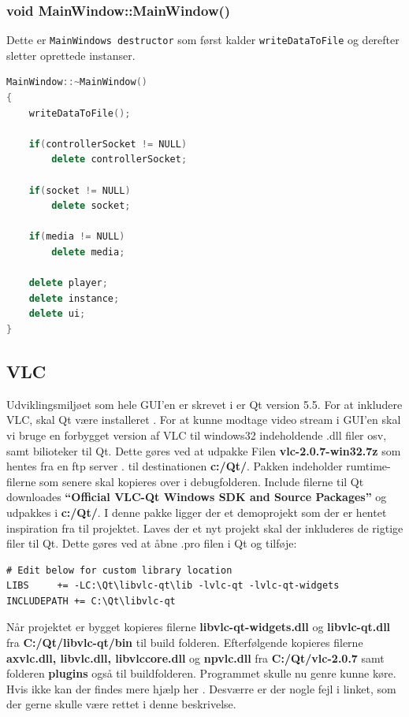 \subsubsection{void MainWindow::MainWindow()}
Dette er \texttt{MainWindows destructor} som først kalder \texttt{writeDataToFile} og derefter sletter oprettede instanser.
\begin{lstlisting}[caption={MainWindow},label=lst:MainWindow, language=c++]
MainWindow::~MainWindow()
{
    writeDataToFile();

    if(controllerSocket != NULL)
        delete controllerSocket;

    if(socket != NULL)
        delete socket;

    if(media != NULL)
        delete media;

    delete player;
    delete instance;
    delete ui;
}
\end{lstlisting}

\subsection{VLC}
Udviklingsmiljøet som hele GUI'en er skrevet i er Qt version 5.5. For at inkludere VLC, skal Qt være installeret \cite{lib:qt}. For at kunne modtage video stream i GUI'en skal vi bruge en forbygget version af VLC til windows32 indeholdende .dll filer osv, samt bilioteker til Qt. Dette gøres ved at udpakke Filen \textbf{vlc-2.0.7-win32.7z} som hentes fra en ftp server \cite{lib:vlc-ftp}. til destinationen \textbf{c:/Qt/}. Pakken indeholder rumtime-filerne som senere skal kopieres over i debugfolderen. Include filerne til Qt downloades \textbf{“Official VLC-Qt Windows SDK and Source Packages”} \cite{lib:vlc-qt} og udpakkes i \textbf{c:/Qt/}. I denne pakke ligger der et demoprojekt som der er hentet inspiration fra til projektet. Laves der et nyt projekt skal der inkluderes de rigtige filer til Qt. Dette gøres ved at åbne .pro filen i Qt og tilføje:

\begin{lstlisting}
# Edit below for custom library location
LIBS     += -LC:\Qt\libvlc-qt\lib -lvlc-qt -lvlc-qt-widgets
INCLUDEPATH += C:\Qt\libvlc-qt
\end{lstlisting}
Når projektet er bygget kopieres filerne \textbf{libvlc-qt-widgets.dll} og \textbf{libvlc-qt.dll} fra \textbf{C:/Qt/libvlc-qt/bin} til build folderen. Efterfølgende kopieres filerne \textbf{axvlc.dll, libvlc.dll, libvlccore.dll} og \textbf{npvlc.dll} fra \textbf{C:/Qt/vlc-2.0.7} samt folderen \textbf{plugins} også til buildfolderen. Programmet skulle nu genre kunne køre. Hvis ikke kan der findes mere hjælp her \cite{lib:vlc-using-qt}. Desværre er der nogle fejl i linket, som der gerne skulle være rettet i denne beskrivelse. 